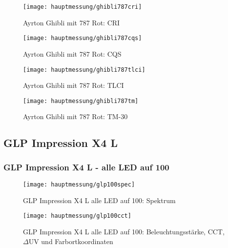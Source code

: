 \documentclass[pagesize,paper=A4,fontsize=12pt,utf8,numbers=noenddot,bibliography=totoc,listof=totoc,DIV=11,BCOR=1mm]{scrreprt}
\begin{document}
\begin{figure}[htp]     %
\centering
\texttt{[image: hauptmessung/ghibli787cri]} 
\caption {Ayrton Ghibli mit 787 Rot: CRI} 
\end{figure}

\begin{figure}[htp]     %
\centering
\texttt{[image: hauptmessung/ghibli787cqs]} 
\caption {Ayrton Ghibli mit 787 Rot: CQS} 
\end{figure}

\begin{figure}[htp]     %
\centering
\texttt{[image: hauptmessung/ghibli787tlci]} 
\caption {Ayrton Ghibli mit 787 Rot: TLCI} 
\end{figure}

\begin{figure}[htp]     %
\centering
\texttt{[image: hauptmessung/ghibli787tm]} 
\caption {Ayrton Ghibli mit 787 Rot: TM-30} 
\end{figure}


\subsection{GLP Impression X4 L}

\subsubsection{GLP Impression X4 L - alle LED auf 100}

\begin{figure}[htp]     %
\centering
\texttt{[image: hauptmessung/glp100spec]} 
\caption {GLP Impression X4 L alle LED auf 100: Spektrum} 
\end{figure}

\begin{figure}[htp]     %
\centering
\texttt{[image: hauptmessung/glp100cct]} 
\caption {GLP Impression X4 L alle LED auf 100: Beleuchtungsstärke, CCT, $\Delta$UV und Farbortkoordinaten} 
\end{figure}
\end{document}
